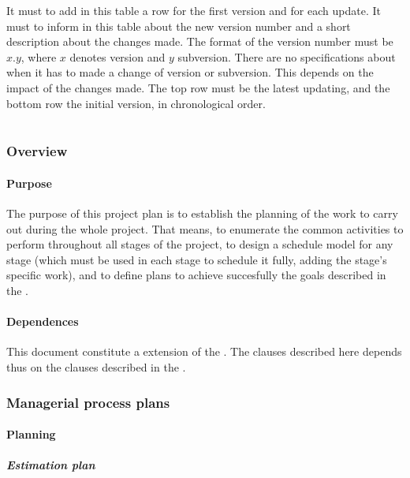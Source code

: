 \documentclass[twocolumn]{article}
\begin{document}
It must to add in this table a row for the first version and for each
update. It must to inform in this table about the new version number
and a short description about the changes made. The format of the
version number must be $x.y$, where $x$ denotes version and $y$
subversion. There are no specifications about when it has to made a
change of version or subversion. This depends on the impact of the
changes made. The top row must be the latest updating, and the bottom
row the initial version, in chronological order.

\part{\favpl}
\label{part:st0-plan}

\section{Overview}
\subsection{Purpose}
The purpose of this project plan is to establish the planning of the
work to carry out during the whole project. That means, to enumerate
the common activities to perform throughout all stages of the project,
to design a schedule model for any stage (which must be used in each
stage to schedule it fully, adding the stage's specific work), and to
define plans to achieve succesfully the goals described in the \favp.

\subsection{Dependences}
This document constitute a extension of the \favc. The clauses
described here depends thus on the clauses described in the \favc.

\section{Managerial process plans}
\subsection{Planning}
\subsubsection{Estimation plan}
\end{document}
